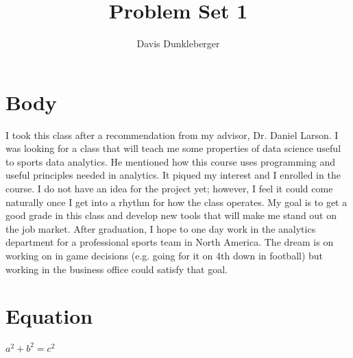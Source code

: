 \documentclass{article}
\title{Problem Set 1}
\author{Davis Dunkleberger}
\begin{document}
\maketitle


\section{Body}

I took this class after a recommendation from my advisor, Dr. Daniel Larson. I was looking for a class that will teach me some properties of data science useful to sports data analytics. He mentioned how this course uses programming and useful principles needed in analytics. It piqued my interest and I enrolled in the course. I do not have an idea for the project yet; however, I feel it could come naturally once I get into a rhythm for how the class operates. My goal is to get a good grade in this class and develop new tools that will make me stand out on the job market. After graduation, I hope to one day work in the analytics department for a professional sports team in North America. The dream is on working on in game decisions (e.g. going for it on 4th down in football) but working in the business office could satisfy that goal. 


\section{Equation}

$ a^2 + b^2 = c^2 $
\end{document}
